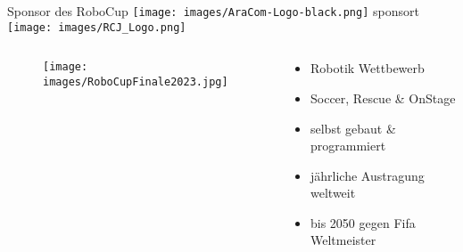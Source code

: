 \documentclass[aspectratio=169]{beamer}
\begin{document}
\begin{frame}{Sponsor des RoboCup}
  \texttt{[image: images/AraCom-Logo-black.png]} sponsort
  \texttt{[image: images/RCJ\_Logo.png]}
  \begin{columns}
    \begin{column}{0.45\textwidth}
      \begin{figure}[h]
        \centering
        \texttt{[image: images/RoboCupFinale2023.jpg]}
      \end{figure}
    \end{column}
    \begin{column}{0.45\textwidth}
      \begin{itemize}
        \item Robotik Wettbewerb
        \item Soccer, Rescue \& OnStage
        \item selbst gebaut \& programmiert
        \item jährliche Austragung weltweit
        \item bis 2050 gegen Fifa Weltmeister
      \end{itemize}
    \end{column}
  \end{columns}
\end{frame}
\end{document}
